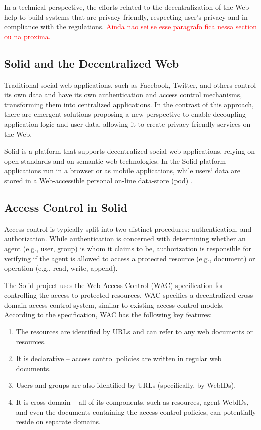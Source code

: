 \documentclass[sigconf]{acmart}
\begin{document}
In a technical perspective, the efforts related to the decentralization of the Web help to build systems that are privacy-friendly, respecting user's privacy and in compliance with the regulations.
\textcolor{red}{Ainda nao sei se esse paragrafo fica nessa section ou na proxima.}

\subsection{Solid and the Decentralized Web}
Traditional social web applications, such as Facebook, Twitter, and others control its own data and have its own authentication and access control mechanisms, transforming them into centralized applications. In the contrast of this approach, there are emergent solutions proposing a new perspective to enable decoupling application logic and user data, allowing it to create privacy-friendly services on the Web.

Solid is a platform that supports decentralized social web applications, relying on open standards and on semantic web technologies. In the Solid platform applications run in a browser or as mobile applications, while users` data are stored in a Web-accessible personal on-line data-store (pod) \cite{Sambra2016}.

\subsection{Access Control in Solid}

Access control is typically split into two distinct procedures: authentication, and authorization. While authentication is concerned with determining whether an agent (e.g., user, group) is whom it claims to be, authorization is responsible for verifying if the agent is allowed to access a protected resource (e.g., document) or operation (e.g., read, write, append).

The Solid project uses the Web Access Control (WAC) specification for controlling the access to protected resources. WAC specifies a decentralized cross-domain access control system, similar to existing access control models. According to the specification, WAC has the following key features:

\begin{enumerate}
\item The resources are identified by URLs and can refer to any web documents or resources.
\item It is declarative -- access control policies are written in regular web documents.
\item Users and groups are also identified by URLs (specifically, by WebIDs).
\item It is cross-domain -- all of its components, such as resources, agent WebIDs, and even the documents containing the access control policies, can potentially reside on separate domains.
\end{enumerate}
\end{document}
